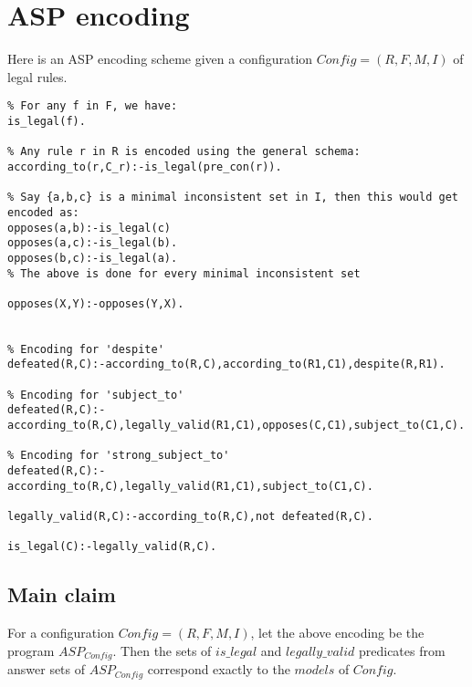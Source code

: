 \section{ASP encoding}
Here is an ASP encoding scheme given a configuration $Config = (R,F,M,I)$ of legal rules.
\begin{verbatim}
% For any f in F, we have:
is_legal(f).    

% Any rule r in R is encoded using the general schema:
according_to(r,C_r):-is_legal(pre_con(r)).

% Say {a,b,c} is a minimal inconsistent set in I, then this would get encoded as: 
opposes(a,b):-is_legal(c)
opposes(a,c):-is_legal(b).
opposes(b,c):-is_legal(a).
% The above is done for every minimal inconsistent set

opposes(X,Y):-opposes(Y,X).


% Encoding for 'despite'
defeated(R,C):-according_to(R,C),according_to(R1,C1),despite(R,R1).

% Encoding for 'subject_to'
defeated(R,C):-according_to(R,C),legally_valid(R1,C1),opposes(C,C1),subject_to(C1,C).

% Encoding for 'strong_subject_to'
defeated(R,C):-according_to(R,C),legally_valid(R1,C1),subject_to(C1,C).

legally_valid(R,C):-according_to(R,C),not defeated(R,C).

is_legal(C):-legally_valid(R,C).
\end{verbatim}
\subsection{Main claim}
For a configuration $Config=(R,F,M,I)$, let the above encoding be the program $ASP_{Config}$. Then the sets of $is\_legal$ and $legally\_valid$ predicates from answer sets of $ASP_{Config}$ correspond exactly to the $models$ of $Config$.
